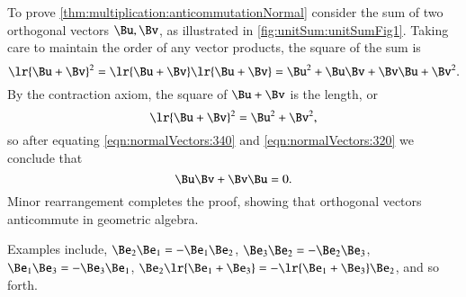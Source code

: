 %
%

To prove \cref{thm:multiplication:anticommutationNormal} consider the
sum of two orthogonal vectors \( \Bu, \Bv \), as illustrated in \cref{fig:unitSum:unitSumFig1}.
Taking care to maintain the order of any vector products,
the square of the sum is
\begin{dmath}\label{eqn:normalVectors:340}
\lr{ \Bu + \Bv }^2 =
\lr{ \Bu + \Bv }
\lr{ \Bu + \Bv }
=
\Bu^2 + \Bu \Bv + \Bv \Bu + \Bv^2.
\end{dmath}
By the contraction axiom, the square of \( \Bu + \Bv \) is the length, or
\begin{dmath}\label{eqn:normalVectors:320}
\lr{ \Bu + \Bv }^2 = \Bu^2 + \Bv^2,
\end{dmath}
so after equating
\cref{eqn:normalVectors:340}
and
\cref{eqn:normalVectors:320}
we conclude that
\begin{dmath}\label{eqn:normalVectors:360}
\Bu \Bv + \Bv \Bu = 0.
\end{dmath}
Minor rearrangement completes the proof, showing that orthogonal vectors anticommute in geometric algebra.

Examples include,
\( \Be_2 \Be_1 = -\Be_1 \Be_2 \),
\( \Be_3 \Be_2 = -\Be_2 \Be_3 \),
\( \Be_1 \Be_3 = -\Be_3 \Be_1 \),
\( \Be_2 \lr{ \Be_1 + \Be_3} = -\lr{ \Be_1 + \Be_3} \Be_2 \), and so forth.

